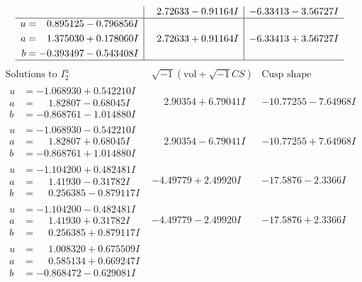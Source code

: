 \documentclass[1p]{elsarticle_modified}
\theoremstyle{definition}
\newcommand{\I}{\sqrt{-1}}
\begin{document}
$$\begin{array}{c|c|c}
 & \phantom{-}2.72633 - 0.91164 I & -6.33413 - 3.56727 I \\ \hline\begin{aligned}
u &= \phantom{-}0.895125 - 0.796856 I \\
a &= \phantom{-}1.375030 + 0.178060 I \\
b &= -0.393497 - 0.543408 I\end{aligned}
 & \phantom{-}2.72633 + 0.91164 I & -6.33413 + 3.56727 I\\
 \hline 
 \end{array}$$\newpage$$\begin{array}{c|c|c}  
\text{Solutions to }I^u_{2}& \I (\text{vol} + \sqrt{-1}CS) & \text{Cusp shape}\\
 \hline 
\begin{aligned}
u &= -1.068930 + 0.542210 I \\
a &= \phantom{-}1.82807 - 0.68045 I \\
b &= -0.868761 - 1.014880 I\end{aligned}
 & \phantom{-}2.90354 + 6.79041 I & -10.77255 - 7.64968 I \\ \hline\begin{aligned}
u &= -1.068930 - 0.542210 I \\
a &= \phantom{-}1.82807 + 0.68045 I \\
b &= -0.868761 + 1.014880 I\end{aligned}
 & \phantom{-}2.90354 - 6.79041 I & -10.77255 + 7.64968 I \\ \hline\begin{aligned}
u &= -1.104200 + 0.482481 I \\
a &= \phantom{-}1.41930 - 0.31782 I \\
b &= \phantom{-}0.256385 - 0.879117 I\end{aligned}
 & -4.49779 + 2.49920 I & -17.5876 - 2.3366 I \\ \hline\begin{aligned}
u &= -1.104200 - 0.482481 I \\
a &= \phantom{-}1.41930 + 0.31782 I \\
b &= \phantom{-}0.256385 + 0.879117 I\end{aligned}
 & -4.49779 - 2.49920 I & -17.5876 + 2.3366 I \\ \hline\begin{aligned}
u &= \phantom{-}1.008320 + 0.675509 I \\
a &= \phantom{-}0.585134 + 0.669247 I \\
b &= -0.868472 - 0.629081 I\end{aligned}

\end{array}$$
\end{document}
